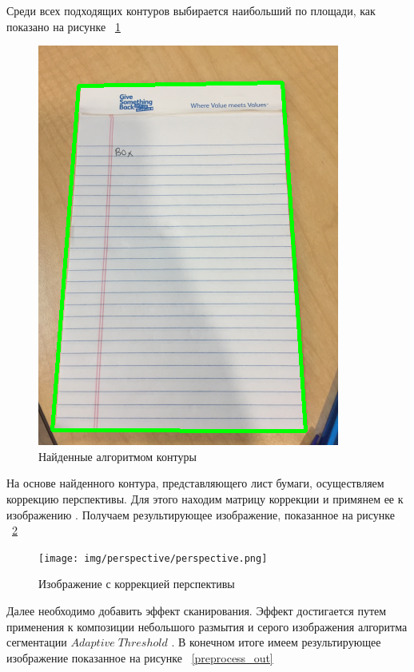 Среди всех подходящих контуров выбирается наибольший по площади, как показано на рисунке ~\ref{contours}
\begin{figure}
    \includegraphics[scale=0.25]{img/perspective/contours.png}
    \caption{Найденные алгоритмом контуры}
    \label{contours}
\end{figure}


На основе найденного контура, представляющего лист бумаги, осуществляем коррекцию перспективы. Для этого находим матрицу коррекции \cite{opencv_perspective_transform} и примянем ее к изображению \cite{opencv_warp_perspective}.
Получаем результирующее изображение, показанное на рисунке ~\ref{perspective_correction}
\begin{figure}
    \texttt{[image: img/perspective/perspective.png]}
    \caption{Изображение с коррекцией перспективы}
    \label{perspective_correction}
\end{figure}

Далее необходимо добавить эффект сканирования. Эффект достигается путем применения к композиции небольшого размытия и серого изображения алгоритма сегментации $Adaptive\;Threshold$ \cite{opencv_threshold}. 
В конечном итоге имеем результирующее изображение показанное на рисунке ~\ref{preprocess_out}

